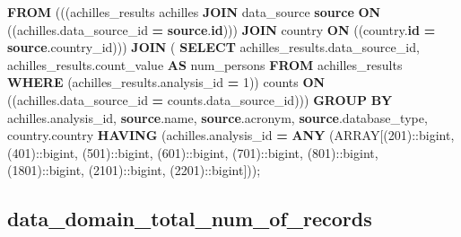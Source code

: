 \documentclass[
]{book}
\newenvironment{Shaded}{\begin{snugshade}}{\end{snugshade}}
\newcommand{\CharTok}[1]{\textcolor[rgb]{0.31,0.60,0.02}{#1}}
\newcommand{\DataTypeTok}[1]{\textcolor[rgb]{0.13,0.29,0.53}{#1}}
\newcommand{\DecValTok}[1]{\textcolor[rgb]{0.00,0.00,0.81}{#1}}
\newcommand{\KeywordTok}[1]{\textcolor[rgb]{0.13,0.29,0.53}{\textbf{#1}}}
\newcommand{\NormalTok}[1]{#1}
\newcommand{\OperatorTok}[1]{\textcolor[rgb]{0.81,0.36,0.00}{\textbf{#1}}}
\begin{document}
\begin{Shaded}
\begin{Highlighting}[]
  \KeywordTok{FROM}\NormalTok{ (((achilles\_results achilles}
    \KeywordTok{JOIN}\NormalTok{ data\_source }\KeywordTok{source} \KeywordTok{ON}\NormalTok{ ((achilles.data\_source\_id }\OperatorTok{=} \KeywordTok{source}\NormalTok{.}\KeywordTok{id}\NormalTok{)))}
    \KeywordTok{JOIN}\NormalTok{ country }\KeywordTok{ON}\NormalTok{ ((country.}\KeywordTok{id} \OperatorTok{=} \KeywordTok{source}\NormalTok{.country\_id)))}
    \KeywordTok{JOIN}\NormalTok{ ( }\KeywordTok{SELECT}\NormalTok{ achilles\_results.data\_source\_id,}
\NormalTok{           achilles\_results.count\_value }\KeywordTok{AS}\NormalTok{ num\_persons}
          \KeywordTok{FROM}\NormalTok{ achilles\_results}
         \KeywordTok{WHERE}\NormalTok{ (achilles\_results.analysis\_id }\OperatorTok{=} \DecValTok{1}\NormalTok{)) counts }\KeywordTok{ON}\NormalTok{ ((achilles.data\_source\_id }\OperatorTok{=}\NormalTok{ counts.data\_source\_id)))}
 \KeywordTok{GROUP} \KeywordTok{BY}\NormalTok{ achilles.analysis\_id, }\KeywordTok{source}\NormalTok{.name, }\KeywordTok{source}\NormalTok{.acronym, }\KeywordTok{source}\NormalTok{.database\_type, country.country}
\KeywordTok{HAVING}\NormalTok{ (achilles.analysis\_id }\OperatorTok{=} \KeywordTok{ANY}\NormalTok{ (}\DataTypeTok{ARRAY}\NormalTok{[(}\DecValTok{201}\NormalTok{):}\CharTok{:bigint}\NormalTok{, (}\DecValTok{401}\NormalTok{):}\CharTok{:bigint}\NormalTok{, (}\DecValTok{501}\NormalTok{):}\CharTok{:bigint}\NormalTok{, (}\DecValTok{601}\NormalTok{):}\CharTok{:bigint}\NormalTok{, (}\DecValTok{701}\NormalTok{):}\CharTok{:bigint}\NormalTok{, (}\DecValTok{801}\NormalTok{):}\CharTok{:bigint}\NormalTok{, (}\DecValTok{1801}\NormalTok{):}\CharTok{:bigint}\NormalTok{, (}\DecValTok{2101}\NormalTok{):}\CharTok{:bigint}\NormalTok{, (}\DecValTok{2201}\NormalTok{):}\CharTok{:bigint}\NormalTok{]));}
\end{Highlighting}
\end{Shaded}

\hypertarget{data_domain_total_num_of_records}{%
\subsection*{data\_domain\_total\_num\_of\_records}\label{data_domain_total_num_of_records}}
\end{document}
